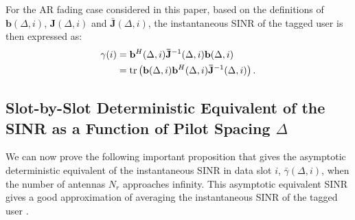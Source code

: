 \documentclass[conference, a4paper, 10pt]{IEEEtran}
\newcommand{\mx}[1]{\mathbf{#1}}
\begin{document}
For the \ac{AR} fading case considered in this paper,
based on the definitions of $\mx{b}(\Delta, i)$, $\mx{J}(\Delta, i)$ and $\mx{\bar{J}}(\Delta, i)$,
the instantaneous \ac{SINR} of the tagged user is then expressed as:
\begin{align}
\gamma(i) &  =  \mx{b}^H(\Delta, i) \mathbf{\bar{J}}^{-1}(\Delta, i) \mx{b}(\Delta, i)
  \nonumber\\
 &=
\textup{tr}\left( \mx{b}(\Delta, i)\mx{b}^H(\Delta, i) \mathbf{\bar{J}}^{-1}(\Delta, i) \right).
\end{align}

\subsection{Slot-by-Slot Deterministic Equivalent of the \ac{SINR} as a Function of Pilot Spacing $\Delta$}
We can now prove the following important proposition that gives the asymptotic deterministic equivalent
of the instantaneous \ac{SINR} in data slot $i$, $\bar{\gamma}(\Delta, i)$, when the number of antennas $N_r$ approaches infinity.
This asymptotic equivalent \ac{SINR} gives a good approximation of averaging the instantaneous \ac{SINR} of the tagged user \cite{Wagner:2012, Hoydis:13, Fodor:22}.
\end{document}
